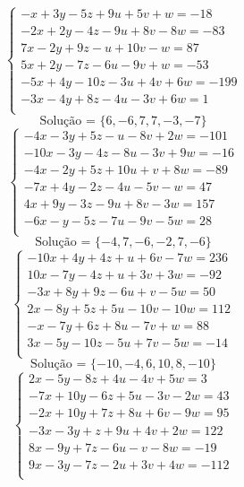 \documentclass[12pt,oneside,a4paper]{article}
\begin{document}
\vspace{\baselineskip}
\begin{equation*}
\begin{cases}
-x+3y-5z+9u+5v+w=-18 \\
-2x+2y-4z-9u+8v-8w=-83 \\
7x-2y+9z-u+10v-w=87 \\
5x+2y-7z-6u-9v+w=-53 \\
-5x+4y-10z-3u+4v+6w=-199 \\
-3x-4y+8z-4u-3v+6w=1 \\
\end{cases}
\end{equation*}
\begin{equation*}
\text{Solução = }\{6,-6,7,7,-3,-7\}
\end{equation*}
\vspace{\baselineskip}
\begin{equation*}
\begin{cases}
-4x-3y+5z-u-8v+2w=-101 \\
-10x-3y-4z-8u-3v+9w=-16 \\
-4x-2y+5z+10u+v+8w=-89 \\
-7x+4y-2z-4u-5v-w=47 \\
4x+9y-3z-9u+8v-3w=157 \\
-6x-y-5z-7u-9v-5w=28 \\
\end{cases}
\end{equation*}
\begin{equation*}
\text{Solução = }\{-4,7,-6,-2,7,-6\}
\end{equation*}
\vspace{\baselineskip}
\begin{equation*}
\begin{cases}
-10x+4y+4z+u+6v-7w=236 \\
10x-7y-4z+u+3v+3w=-92 \\
-3x+8y+9z-6u+v-5w=50 \\
2x-8y+5z+5u-10v-10w=112 \\
-x-7y+6z+8u-7v+w=88 \\
3x-5y-10z-5u+7v-5w=-14 \\
\end{cases}
\end{equation*}
\begin{equation*}
\text{Solução = }\{-10,-4,6,10,8,-10\}
\end{equation*}
\vspace{\baselineskip}
\begin{equation*}
\begin{cases}
2x-5y-8z+4u-4v+5w=3 \\
-7x+10y-6z+5u-3v-2w=43 \\
-2x+10y+7z+8u+6v-9w=95 \\
-3x-3y+z+9u+4v+2w=122 \\
8x-9y+7z-6u-v-8w=-19 \\
9x-3y-7z-2u+3v+4w=-112 \\
\end{cases}
\end{equation*}
\end{document}
